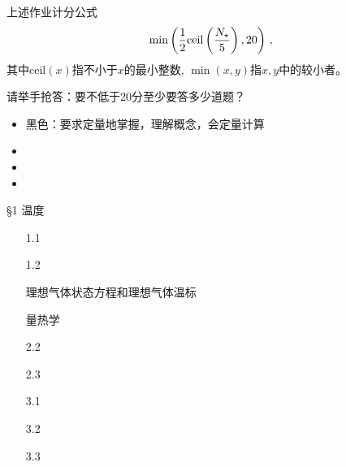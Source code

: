 \documentclass[CJK]{beamer}
\begin{document}
\begin{frame}
\bch
上述作业计分公式
$$ \min\left( \frac{1}{2}{\rm ceil}\left(\frac{N_\star}{5}\right), 20\right) \, , $$
其中$\mathrm{ceil}(x)$指不小于$x$的最小整数, $\min(x, y)$指$x, y$中的较小者。

\skiplines

请举手抢答：要不低于20分至少要答多少道题？

\ech
\end{frame}

\begin{frame}
\bch

\begin{itemize}
\item{黑色：要求定量地掌握，理解概念，会定量计算}
\item{}
\item{}
\item{}
\end{itemize}

\ech
\end{frame}


\begin{frame}
\bch
\S{1}  温度
\begin{itemize}
\item[1.1]{}
\item[1.2]{}
\item[\blacktext{1.3}]{理想气体状态方程和理想气体温标}
\item[\greentext{1.4}]{}
\end{itemize}
\begin{itemize}
\item[\blacktext{2.1}]{量热学 }
\item[2.2]{}
\item[2.3]{}
\end{itemize}

\begin{itemize}
\item[3.1]{}
\item[3.2]{}
\item[3.3]{}
\end{itemize}

\ech
\end{frame}
\end{document}

